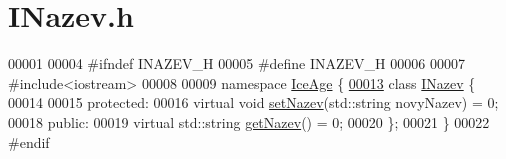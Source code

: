 \hypertarget{INazev_8h_source}{}\section{I\+Nazev.\+h}
\label{INazev_8h_source}

\begin{DoxyCode}
00001 
00004 \textcolor{preprocessor}{#ifndef INAZEV\_H}
00005 \textcolor{preprocessor}{#define INAZEV\_H}
00006 
00007 \textcolor{preprocessor}{#include<iostream>}
00008 
00009 \textcolor{keyword}{namespace }\hyperlink{namespaceIceAge}{IceAge} \{
\hypertarget{INazev_8h_source.tex_l00013}{}\hyperlink{classIceAge_1_1INazev}{00013}     \textcolor{keyword}{class }\hyperlink{classIceAge_1_1INazev}{INazev} \{
00014 
00015     \textcolor{keyword}{protected}:
00016         \textcolor{keyword}{virtual} \textcolor{keywordtype}{void} \hyperlink{classIceAge_1_1INazev_a5505f37cebf3dd811c6ca03058a0aa2d}{setNazev}(std::string novyNazev) = 0;
00018     \textcolor{keyword}{public}:
00019         \textcolor{keyword}{virtual} std::string \hyperlink{classIceAge_1_1INazev_a0731b35c3ffc3234a7e1f9a01c5374f7}{getNazev}() = 0;
00020     \};
00021 \}
00022 \textcolor{preprocessor}{#endif}
\end{DoxyCode}
